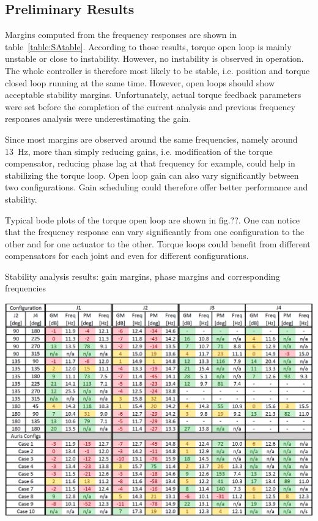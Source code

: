 \subsection{Preliminary Results}

Margins computed from the frequency responses are shown in table~\ref{table:SAtable}. According to those results, torque open loop is mainly unstable or close to instability. However, no instability is observed in operation. The whole controller is therefore most likely to be stable, i.e. position and torque closed loop running at the same time. However, open loops should show acceptable stability margins. Unfortunately, actual torque feedback parameters were set before the completion of the current analysis and previous frequency responses analysis were underestimating the gain.

Since most margins are observed around the same frequencies, namely around 13~Hz, more than simply reducing gains, i.e. modification of the torque compensator, reducing phase lag at that frequency for example, could help in stabilizing the torque loop. Open loop gain can also vary significantly between two configurations. Gain scheduling could therefore offer better performance and stability.

Typical bode plots of the torque open loop are shown in fig.??. One can notice that the frequency response can vary significantly from one configuration to the other and for one actuator to the other. Torque loops could benefit from different compensators for each joint and even for different configurations.


	\begin{table}[t]
		\centering
		\caption{Stability analysis results: gain margins, phase margins and corresponding frequencies}
		\includegraphics[width=1\textwidth]{./images/SAtable.pdf}%
		\label{table:SAtable}
	\end{table}


